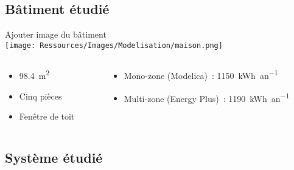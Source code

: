 \documentclass[xcolor=x11names, compress, 11pt]{beamer}
\begin{document}
\subsection{Bâtiment étudié}
\begin{frame}[c]
    \vfill
    \centering
    Ajouter image du bâtiment \\
    \texttt{[image: Ressources/Images/Modelisation/maison.png]}
    \begin{columns}
        \begin{column}{0.4\textwidth}
            \centering
            \begin{itemize}
                \item \SI{98.4}{\metre\squared}
                \item Cinq pièces
                \item Fenêtre de toit
            \end{itemize}
        \end{column}%
        \begin{column}{0.7\textwidth}
            \centering
            \begin{itemize}
                \item Mono-zone (Modelica)~: \SI{1150}{kWh\per an}
                \item Multi-zone (Energy Plus)~: \SI{1190}{kWh\per an}
            \end{itemize}
        \end{column}%
    \end{columns}%
    \vfill
\end{frame}



\subsection{Système étudié}
\begin{frame}[c]
    \vfill
    \vfill
\end{frame}
\end{document}
